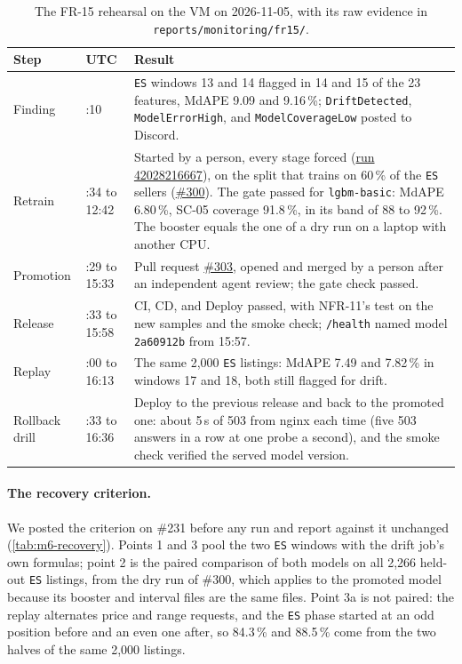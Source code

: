 \begin{table}[ht]
  \centering\small
  \begin{tabularx}{\textwidth}{@{}>{\raggedright\arraybackslash}p{2.0cm}>{\raggedright\arraybackslash}p{2.5cm}X@{}}
    \toprule
    Step & UTC & Result \\
    \midrule
    Finding & 12:10 & \texttt{ES} windows 13 and 14 flagged in 14 and 15 of the 23 features, MdAPE 9.09 and 9.16\,\%; \texttt{DriftDetected}, \texttt{ModelErrorHigh}, and \texttt{ModelCoverageLow} posted to Discord. \\
    Retrain & 12:34 to 12:42 & Started by a person, every stage forced (\href{https://github.com/mlops-2627q1-mds-upc/MLOPS_Recommenditos/actions/runs/42028216667}{run 42028216667}), on the split that trains on 60\,\% of the \texttt{ES} sellers (\href{https://github.com/mlops-2627q1-mds-upc/MLOPS_Recommenditos/pull/300}{\#300}). The gate passed for \texttt{lgbm-basic}: MdAPE 6.80\,\%, SC-05 coverage 91.8\,\%, in its band of 88 to 92\,\%. The booster equals the one of a dry run on a laptop with another CPU. \\
    Promotion & 14:29 to 15:33 & Pull request \href{https://github.com/mlops-2627q1-mds-upc/MLOPS_Recommenditos/pull/303}{\#303}, opened and merged by a person after an independent agent review; the gate check passed. \\
    Release & 15:33 to 15:58 & CI, CD, and Deploy passed, with NFR-11's test on the new samples and the smoke check; \texttt{/health} named model \texttt{2a60912b} from 15:57. \\
    Replay & 16:00 to 16:13 & The same 2,000 \texttt{ES} listings: MdAPE 7.49 and 7.82\,\% in windows 17 and 18, both still flagged for drift. \\
    Rollback drill & 16:33 to 16:36 & Deploy to the previous release and back to the promoted one: about 5\,s of 503 from nginx each time (five 503 answers in a row at one probe a second), and the smoke check verified the served model version. \\
    \bottomrule
  \end{tabularx}
  \caption{The FR-15 rehearsal on the VM on 2026-11-05, with its raw evidence in \texttt{reports/\allowbreak monitoring/\allowbreak fr15/}.}
  \label{tab:m6-rehearsal}
\end{table}

\paragraph{The recovery criterion.}
We posted the criterion on \#231 before any run and report against it unchanged (\cref{tab:m6-recovery}).
Points 1 and 3 pool the two \texttt{ES} windows with the drift job's own formulas; point 2 is the paired comparison of both models on all 2,266 held-out \texttt{ES} listings, from the dry run of \#300, which applies to the promoted model because its booster and interval files are the same files.
Point 3a is not paired: the replay alternates price and range requests, and the \texttt{ES} phase started at an odd position before and an even one after, so 84.3\,\% and 88.5\,\% come from the two halves of the same 2,000 listings.

